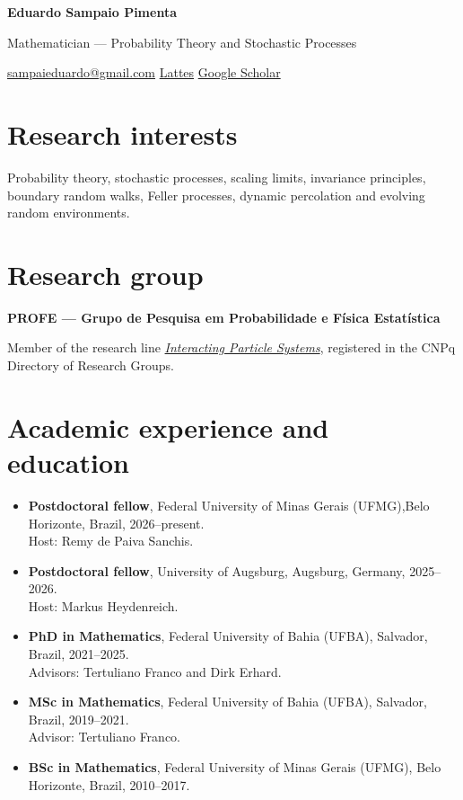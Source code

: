 \documentclass[10pt,a4paper]{article}
\begin{document}
{\LARGE\bfseries Eduardo Sampaio Pimenta}\par
\vspace{3pt}
Mathematician --- Probability Theory and Stochastic Processes\par
\href{mailto:sampaieduardo@gmail.com}{sampaieduardo@gmail.com}\quad
\href{https://lattes.cnpq.br/6512284414514021}{Lattes}\quad
\href{https://scholar.google.com/citations?hl=en\&user=SJJP-ngAAAAJ}{Google Scholar}\par

\section*{Research interests}
Probability theory, stochastic processes, scaling limits, invariance principles, boundary random walks, Feller processes, dynamic percolation and evolving random environments.

\section*{Research group}
\textbf{PROFE --- Grupo de Pesquisa em Probabilidade e F\'isica Estat\'istica}\par
Member of the research line
\href{http://dgp.cnpq.br/dgp/espelholinha/790496658105085770869}{\emph{Interacting Particle Systems}},
registered in the CNPq Directory of Research Groups.

\section*{Academic experience and education}
\begin{itemize}
  \item \textbf{Postdoctoral fellow}, Federal University of Minas Gerais (UFMG),Belo Horizonte, Brazil, 2026--present.
        \\ Host: Remy de Paiva Sanchis.
  \item \textbf{Postdoctoral fellow}, University of Augsburg, Augsburg, Germany, 2025--2026.
        \\ Host: Markus Heydenreich.
  \item \textbf{PhD in Mathematics}, Federal University of Bahia (UFBA), Salvador, Brazil, 2021--2025.
        \\ Advisors: Tertuliano Franco and Dirk Erhard.
  \item \textbf{MSc in Mathematics}, Federal University of Bahia (UFBA), Salvador, Brazil, 2019--2021.
        \\ Advisor: Tertuliano Franco.
  \item \textbf{BSc in Mathematics}, Federal University of Minas Gerais (UFMG), Belo Horizonte, Brazil, 2010--2017.
\end{itemize}
\end{document}
